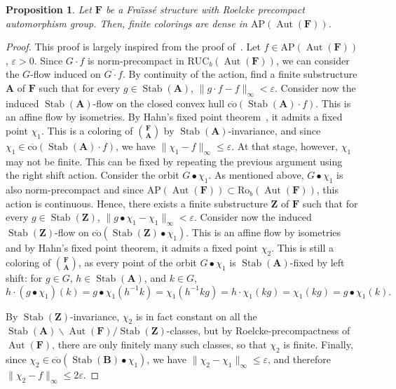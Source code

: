 \documentclass[11pt]{article}
\newtheorem{prop}[theo]{Proposition}
\theoremstyle{definition}
\numberwithin{equation}{section}
\numberwithin{figure}{section}
\numberwithin{table}{section}
\newcommand*{\mA}{\mathbf{A}}
\newcommand*{\mB}{\mathbf{B}}
\newcommand*{\mF}{\mathbf{F}}
\newcommand*{\mZ}{\mathbf{Z}}
\newcommand{\e}{\varepsilon}
\DeclareMathOperator{\Aut}{Aut}
\DeclareMathOperator{\Stab}{Stab}
\newcommand{\RUCB}{\mathrm{RUC}_{b}}
\newcommand{\ROB}{\mathrm{Ro}_{b}}
\newcommand{\AP}{\mathrm{AP}}
\begin{document}
\begin{prop}\label{prop:approxAP}
Let $\mF$ be a Fra\"{\i}ss\'e structure with Roelcke precompact automorphism group. Then, finite colorings are dense in $\mathrm{AP}(\Aut(\mF))$.
\end{prop}

\begin{proof}
This proof is largely inspired from the proof of~\cite[Proposition~4.7]{BYT}. Let $f\in \AP(\Aut(\mF))$, $\e>0$. Since $G\cdot f$ is norm-precompact in $\RUCB(\Aut(\mF))$, we can consider the $G$-flow induced on $\overline{G\cdot f}$. By continuity of the action, find a finite substructure $\mA$ of $\mF$ such that for every $g\in \Stab(\mA)$, $\| g\cdot f - f\|_{\infty}<\e$. Consider now the induced $\Stab(\mA)$-flow on the closed convex hull $\overline{\mathrm{co}}(\Stab(\mA)\cdot f)$. This is an affine flow by isometries. By Hahn's fixed point theorem~\cite[Chapter~III, Section~5]{Gl}, it admits a fixed point $\chi_{1}$. This is a coloring of $\binom{\mF}{\mA}$ by $\Stab(\mA)$-invariance, and since $\chi_{1}\in \overline{\mathrm{co}}(\Stab(\mA)\cdot f)$, we have $\| \chi_{1} - f\|_{\infty}\leq \e$. At that stage, however, $\chi_{1}$ may not be finite. This can be fixed by repeating the previous argument using the right shift action. Consider the orbit $G\bullet \chi_{1}$. As mentioned above, $G\bullet \chi_{1}$ is also norm-precompact and since $\mathrm{AP}(\Aut(\mF)) \subset \ROB(\Aut(\mF))$, this action is continuous. Hence, there exists a finite substructure $\mZ$ of $\mF$ such that for every $g\in \Stab(\mZ)$, $\| g\bullet \chi_{1} - \chi_{1}\|_{\infty}<\e$. Consider now the induced $\Stab(\mZ)$-flow on $\overline{\mathrm{co}}(\Stab(\mZ)\bullet \chi_{1})$. This is an affine flow by isometries and by Hahn's fixed point theorem, it admits a fixed point $\chi_{2}$. This is still a coloring of $\binom{\mF}{\mA}$, as every point of the orbit $G\bullet \chi_{1}$ is $\Stab(\mA)$-fixed by left shift: for $g\in G$, $h\in \Stab(\mA)$, and $k\in G$,
\[
h\cdot(g\bullet \chi_{1})(k)=g\bullet \chi_{1}(h^{-1}k)=\chi_{1}(h^{-1}kg)=h\cdot\chi_{1}(kg)=\chi_{1}(kg)=g\bullet \chi_{1}(k).
\]

By $\Stab(\mZ)$-invariance, $\chi_{2}$ is in fact constant on all the $\Stab(\mA)\backslash \Aut(\mF)/\Stab(\mZ)$-classes, but by Roelcke-precompactness of $\Aut(\mF)$, there are only finitely many such classes, so that $\chi_{2}$ is finite. Finally, since $\chi_{2}\in \overline{\mathrm{co}}(\Stab(\mB)\bullet \chi_{1})$, we have $\| \chi_{2} - \chi_{1}\|_{\infty}\leq \e$, and therefore $\| \chi_{2} - f \|_{\infty}\leq 2\e$.
\end{proof}
\end{document}
